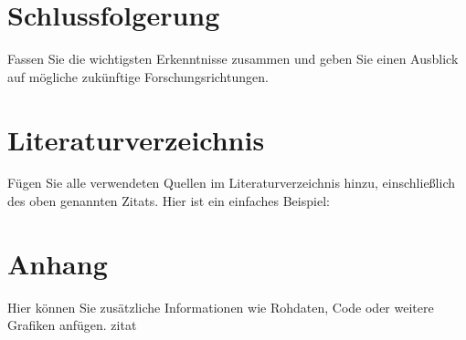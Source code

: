 \documentclass{article}
\begin{document}
	\section{Schlussfolgerung}
	Fassen Sie die wichtigsten Erkenntnisse zusammen und geben Sie einen Ausblick auf mögliche zukünftige Forschungsrichtungen.
	
	\section{Literaturverzeichnis}
	Fügen Sie alle verwendeten Quellen im Literaturverzeichnis hinzu, einschließlich des oben genannten Zitats. Hier ist ein einfaches Beispiel:
	
	\cite{twitter2012twitter}
	
	 
	  
	\appendix
	\section{Anhang}
	Hier können Sie zusätzliche Informationen wie Rohdaten, Code oder weitere Grafiken anfügen.
	zitat
\end{document}
